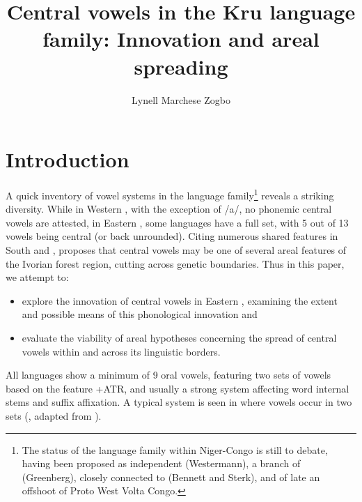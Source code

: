 \documentclass[output=paper,newtxmath,modfonts,nonflat]{langsci/langscibook}
\title{Central vowels in the Kru language family: Innovation and areal spreading}
\author{Lynell Marchese Zogbo\affiliation{University of the Free State; Institut de Linguistique Appliquée, Abidjan}}
\begin{document}
\maketitle 
\section{Introduction}\label{sec:zogbo:1} 

A quick inventory of vowel systems in the  language family\footnote{The status of the  language family within Niger-Congo is still  to debate, having been proposed as independent (Westermann), a branch of  (Greenberg), closely connected to  (Bennett and Sterk), and of late \citep[18]{Williamson2000} an offshoot of Proto West Volta Congo.} reveals a striking diversity.  While in Western , with the exception of /a/, no phonemic central vowels are attested, in Eastern , some languages have a full set, with 5 out of 13 vowels being central (or back unrounded). Citing numerous shared features in South  and , \citet{Vydrine2009} proposes that central vowels may be one of several areal features of the Ivorian forest region, cutting across genetic boundaries.  Thus in this paper, we attempt to:

\begin{itemize}
\item explore the innovation of central vowels in Eastern , examining the extent and possible means of this phonological innovation and \\[-0.75cm]
\item evaluate the viability of areal hypotheses concerning the spread of central vowels within  and across its linguistic borders. 
\end{itemize}

\largerpage[2]
All  languages show a minimum of 9 oral vowels, featuring two sets of vowels based on the feature +ATR, and usually a strong  system affecting word internal stems and suffix affixation. A typical system is seen in  where vowels occur in two sets (, adapted from \citealt[50]{Saunders2009}).
\end{document}
